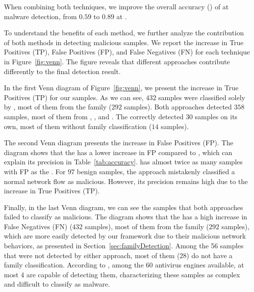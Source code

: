 \begin{finding}
When combining both techniques, we improve the overall accuracy (\fone) of \mas at malware detection, from $0.59$ to $0.89$ at \fds.
\end{finding}


To understand the benefits of each method, we further analyze the contribution of both methods in detecting malicious samples. We report the increase in True Positives (TP), False Positives (FP), and False Negatives (FN) for each technique in Figure~\ref{fig:venn}. The figure reveals that different approaches contribute differently to the final detection result.

In the first Venn diagram of Figure~\ref{fig:venn}, we present the increase in True Positives (TP) for our samples. As we can see, $432$ samples were classified solely by \droidxpflow, most of them from the \gps family ($292$ samples). Both approaches detected $358$ samples, most of them from \gps, , and \dwg. The \mas correctly detected $30$ samples on its own, most of them without family classification ($14$ samples).

The second Venn diagram presents the increase in False Positives (FP). The diagram shows that the \mas has a lower increase in FP compared to \droidxpflow, which can explain its precision in Table~\ref{tab:accuracy}. \droidxpflow has almost twice as many samples with FP as the \mas. For $97$ benign samples, the approach mistakenly classified a normal network flow as malicious. However, its precision remains high due to the increase in True Positives (TP).

Finally, in the last Venn diagram, we can see the samples that both approaches failed to classify as malicious. The diagram shows that the \mas has a high increase in False Negatives (FN) ($432$ samples), most of them from the \gps family ($292$ samples), which are more easily detected by our framework due to their malicious network behaviors, as presented in Section~\ref{sec:familyDetection}. Among the 56 samples that were not detected by either approach, most of them ($28$) do not have a family classification. According to \vt, among the 60 antivirus engines available, at most 4 are capable of detecting them, characterizing these samples as complex and difficult to classify as malware.

